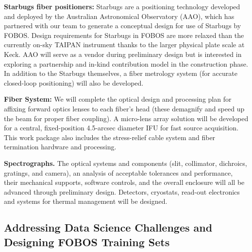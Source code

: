 \documentclass[oneside,11pt]{amsart}
\begin{document}
\noindent \textbf{Starbugs fiber positioners:} Starbugs are a
positioning technology developed and deployed by the Australian
Astronomical Observatory (AAO), which has partnered with our team to
generate a conceptual design for use of Starbugs by FOBOS.  Design
requirements for Starbugs in FOBOS are more relaxed than the currently
on-sky TAIPAN instrument thanks to the larger physical plate scale at
Keck.  AAO will serve as a vendor during preliminary design but is
interested in exploring a partnership and in-kind contribution model in
the construction phase.  In addition to the Starbugs themselves, a fiber
metrology system (for accurate closed-loop positioning) will also be
developed.

\noindent \textbf{Fiber System:} We will complete the optical design and
processing plan for affixing forward optics lenses to each fiber's head
(these demagnify and speed up the beam for proper fiber coupling).  A
micro-lens array solution will be developed for a central,
fixed-position 4.5-arcsec diameter IFU for fast source acquisition. This
work package also includes the stress-relief cable system and fiber
termination hardware and processing.

\noindent \textbf{Spectrographs.} The optical systems and components
(slit, collimator, dichroics, gratings, and camera), an analysis of
acceptable tolerances and performance, their mechanical supports,
software controls, and the overall enclosure will all be advanced
through preliminary design.  Detectors, cryostats, read-out electronics
and systems for thermal management will be designed.



\subsection{Addressing Data Science Challenges and Designing FOBOS Training Sets}
\label{sec:survey}
\end{document}
